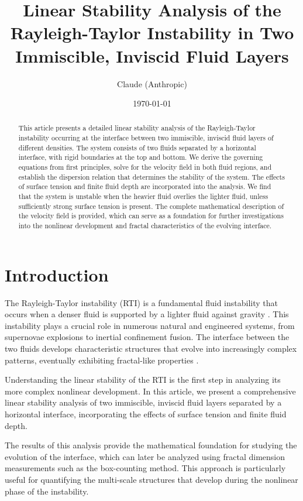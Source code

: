 \documentclass[12pt,a4paper]{article}
\title{Linear Stability Analysis of the Rayleigh-Taylor Instability in Two Immiscible, Inviscid Fluid Layers}
\author{Claude (Anthropic)}
\date{\today}
\begin{document}
\maketitle

\begin{abstract}
    This article presents a detailed linear stability analysis of the Rayleigh-Taylor instability occurring at the interface between two immiscible, inviscid fluid layers of different densities. The system consists of two fluids separated by a horizontal interface, with rigid boundaries at the top and bottom. We derive the governing equations from first principles, solve for the velocity field in both fluid regions, and establish the dispersion relation that determines the stability of the system. The effects of surface tension and finite fluid depth are incorporated into the analysis. We find that the system is unstable when the heavier fluid overlies the lighter fluid, unless sufficiently strong surface tension is present. The complete mathematical description of the velocity field is provided, which can serve as a foundation for further investigations into the nonlinear development and fractal characteristics of the evolving interface.
\end{abstract}

\section{Introduction}
The Rayleigh-Taylor instability (RTI) is a fundamental fluid instability that occurs when a denser fluid is supported by a lighter fluid against gravity \citep{rayleigh1882, taylor1950}. This instability plays a crucial role in numerous natural and engineered systems, from supernovae explosions to inertial confinement fusion. The interface between the two fluids develops characteristic structures that evolve into increasingly complex patterns, eventually exhibiting fractal-like properties \citep{sharp1984, youngs1991}.

Understanding the linear stability of the RTI is the first step in analyzing its more complex nonlinear development. In this article, we present a comprehensive linear stability analysis of two immiscible, inviscid fluid layers separated by a horizontal interface, incorporating the effects of surface tension and finite fluid depth.

The results of this analysis provide the mathematical foundation for studying the evolution of the interface, which can later be analyzed using fractal dimension measurements such as the box-counting method. This approach is particularly useful for quantifying the multi-scale structures that develop during the nonlinear phase of the instability.
\end{document}
